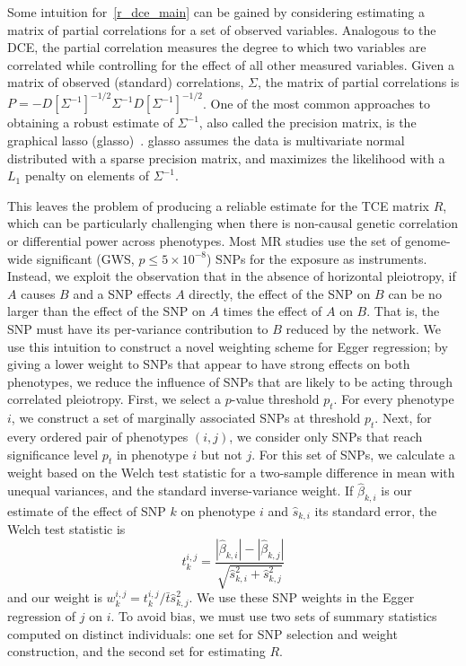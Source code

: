 \documentclass{article}
\begin{document}
Some intuition for~\eqref{r_dce_main} can be gained by considering estimating a matrix of partial correlations for a set of observed variables.
Analogous to the DCE, the partial correlation measures the degree to which two
variables are correlated while controlling for the effect of all other measured
variables. Given a matrix of observed (standard) correlations, $\Sigma$, the matrix of
partial correlations is $P = -D[\Sigma^{-1}]^{-1/2} \Sigma^{-1} D[\Sigma^{-1}]^{-1/2}$. One of
the most common approaches to obtaining a robust estimate of $\Sigma^{-1}$, also
called the precision matrix,  is the graphical lasso (glasso)~\cite{Friedman2007}.
glasso assumes the data is multivariate normal distributed with a sparse
precision matrix, and maximizes the likelihood with a $L_1$ penalty on elements of $\Sigma^{-1}$.

This leaves the problem of producing a reliable estimate for the TCE matrix $R$,
which can be particularly challenging when there is non-causal genetic correlation or
differential power across phenotypes. Most MR studies use the set of
genome-wide significant (GWS, $p \le 5\times 10^{-8}$) SNPs for the exposure as instruments.
Instead, we exploit the observation that in the absence of horizontal pleiotropy, 
if $A$ causes $B$ and a SNP effects $A$ directly,
the effect of the SNP on $B$ can be no larger than the effect of the SNP on $A$ times
the effect of $A$ on $B$. That is, the SNP must have its per-variance contribution to
$B$ reduced by the network. We use this intuition to construct a novel
weighting scheme for Egger regression; by giving a lower weight to SNPs that appear
to have strong effects on both phenotypes, we reduce the influence of SNPs that are
likely to be acting through correlated pleiotropy. 
First, we select a $p$-value threshold $p_t$. For every phenotype $i$, we
 construct a set of marginally associated SNPs at threshold $p_t$. Next,
 for every ordered pair of phenotypes $(i, j)$, we consider only SNPs that reach
 significance level $p_t$ in phenotype $i$ but not $j$. For this set of SNPs, we calculate
 a weight based on the Welch test statistic for a two-sample difference in mean with unequal
 variances,
 and the standard inverse-variance weight. If $\hat{\beta}_{k, i}$ is our estimate
 of the effect of SNP $k$ on phenotype $i$ and $\hat{s}_{k, i}$ its standard error,
 the Welch test statistic is~\cite{Welch1947}
\begin{equation}
t^{i,j}_k = \frac{|\hat{\beta}_{k, i}| - |\hat{\beta}_{k, j}|}
  {\sqrt{\hat{s}^2_{k, i} + \hat{s}^2_{k, j}}}
\end{equation}
and our weight is $w^{i, j}_k = t^{i,j}_k/\bar{t} \hat{s}_{k, j}^2$.
We use these SNP weights in the Egger regression of $j$ on $i$.
To avoid bias, we must use two sets of summary
statistics computed on distinct individuals: one set for SNP selection and weight construction,
 and the second set for estimating $R$.
\end{document}
